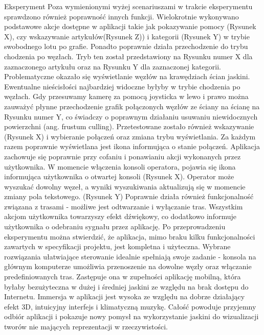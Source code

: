 \begin{chapter}{Eksperyment}
Poza wymienionymi wyżej scenariuszami w trakcie eksperymentu sprawdzono również poprawność innych funkcji. Wielokrotnie wykonywano podstawowe akcje dostępne w aplikacji takie jak pokazywanie pomocy (Rysunek X), czy wskazywanie artykułów(Rysunek Z))  i kategorii (Rysunek Y) w trybie swobodnego lotu po grafie. 
Ponadto poprawnie działa przechodzenie do trybu chodzenia po węzłach. Tryb ten został przedstawiony na Rysunku numer X dla zaznaczonego artykułu oraz na Rysunku Y dla zaznaczonej kategorii. Problematyczne okazało się wyświetlanie węzłów na krawędziach ścian jaskini. Ewentualne nieścisłości najbardziej widoczne byłyby w trybie chodzenia po węzłach. Gdy przesuwamy kamerę za pomocą joysticka w lewo i prawo można zauważyć płynne przechodzenie grafik połączonych węzłów ze ściany na ścianę na Rysunku numer Y, co świadczy o poprawnym działaniu usuwaniu niewidocznych powierzchni (ang. frustum culling). 
Przetestowane zostało również wskazywanie (Rysunek X) i wybieranie połączeń oraz zmiana trybu wyświetlania. Za każdym razem poprawnie wyświetlana jest ikona informująca o stanie połączeń. Aplikacja zachowuje się poprawnie przy cofaniu i ponawianiu akcji wykonanych przez użytkownika. W momencie włączenia konsoli operatora, pojawia się ikona informująca użytkownika o otwartej konsoli (Rysunek X). Operator może wyszukać dowolny węzeł, a wyniki wyszukiwania aktualizują się w momencie zmiany pola tekstowego. (Rysunek Y) Poprawnie działa również funkcjonalność związana z trasami - możliwe jest odtwarzanie i wyłączanie tras. Wszystkim akcjom użytkownika towarzyszy efekt dźwiękowy, co dodatkowo informuje użytkownika o odebraniu sygnału przez aplikację.
Po przeprowadzeniu eksperymentu można stwierdzić, że aplikacja, mimo braku kilku funkcjonalności zawartych w specyfikacji projektu, jest kompletna i użyteczna. Wybrane rozwiązania ułatwiające sterowanie idealnie spełniają swoje zadanie - konsola na głównym komputerze umożliwia przenoszenie na dowolne węzły oraz włączanie predefiniowanych tras.  Zastępuje ona w zupełności aplikację mobilną, która byłaby bezużyteczna w dużej i średniej jaskini ze względu na brak dostępu do Internetu. Immersja w aplikacji jest wysoka ze względu na dobrze działający efekt 3D, intuicyjny interfejs i klimatyczną muzykę. Całość powoduje przyjemny odbiór aplikacji i pokazuje nowy pomysł na wykorzystanie jaskini do wizualizacji tworów nie mających reprezentacji w rzeczywistości. 

\end{chapter}

